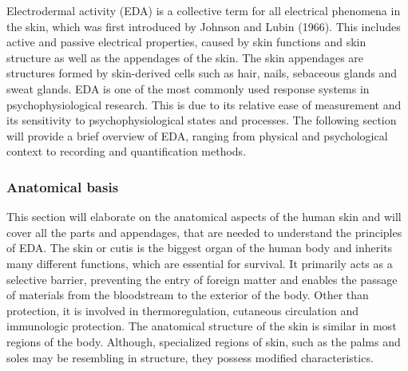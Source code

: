 

Electrodermal activity (EDA) is a collective term for all electrical phenomena in the skin, which was first introduced by Johnson and Lubin (1966). This includes active and passive electrical properties, caused by skin functions and skin structure as well as the appendages of the skin.%
The skin appendages are structures formed by skin-derived cells such as hair, nails, sebaceous glands and sweat glands. EDA is one of the most commonly used response systems in psychophysiological research. This is due to its relative ease of measurement and its sensitivity to psychophysiological states and processes. The following section will provide a brief overview of EDA, ranging from physical and psychological context to recording and quantification methods.

\subsubsection{Anatomical basis} 
This section will elaborate on the anatomical aspects of the human skin and will cover all the parts and appendages, that are needed to understand the principles of EDA. The skin or cutis is the biggest organ of the human body and inherits many different functions, which are essential for survival. It primarily acts as a selective barrier, preventing the entry of foreign matter and enables the passage of materials from the bloodstream to the exterior of the body. Other than protection, it is involved in thermoregulation, cutaneous circulation and immunologic protection.  
The anatomical structure of the skin is similar in most regions of the body. Although, specialized regions of skin, such as the palms and soles may be resembling in structure, they possess modified characteristics.%

